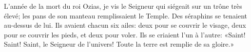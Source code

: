 L’année de la mort du roi Ozias,
	je vis le Seigneur qui siégeait sur un trône très élevé;
	les pans de son manteau remplissaient le Temple.
Des séraphins se tenaient au-dessus de lui.
	Ils avaient chacun six ailes:
	deux pour se couvrir le visage,
	deux pour se couvrir les pieds,
	et deux pour voler.
Ils se criaient l’un à l’autre:
	«Saint! Saint! Saint, le Seigneur de l’univers!
	Toute la terre est remplie de sa gloire.»
